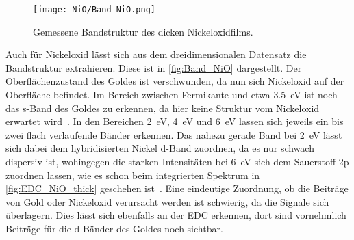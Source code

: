         \begin{figure}
            \centering
            \texttt{[image: NiO/Band\_NiO.png]}
            \caption{Gemessene Bandstruktur des dicken Nickeloxidfilms.}
            \label{fig:Band_NiO}
        \end{figure}
        Auch für Nickeloxid lässt sich aus dem dreidimensionalen Datensatz die Bandstruktur extrahieren.
        Diese ist in \autoref{fig:Band_NiO} dargestellt. %
        Der Oberflächenzustand des Goldes ist verschwunden, da nun sich Nickeloxid auf der Oberfläche befindet.
        Im Bereich zwischen Fermikante und etwa \SI{3.5}{\electronvolt} ist noch das s-Band des Goldes zu erkennen, da hier keine Struktur vom Nickeloxid erwartet wird~\cite{NiO_12}.
        In den Bereichen \SI{2}{\electronvolt}, \SI{4}{\electronvolt} und \SI{6}{\electronvolt} lassen sich jeweils ein bis zwei flach verlaufende Bänder erkennen.
        Das nahezu gerade Band bei \SI{2}{\electronvolt} lässt sich dabei dem hybridisierten Nickel d-Band zuordnen, da es nur schwach dispersiv ist, wohingegen die starken Intensitäten bei \SI{6}{\electronvolt} sich dem Sauerstoff 2p zuordnen lassen, wie es schon beim integrierten Spektrum in \autoref{fig:EDC_NiO_thick} geschehen ist~\cite{Hüfner}.
        Eine eindeutige Zuordnung, ob die Beiträge von Gold oder Nickeloxid verursacht werden ist schwierig, da die Signale sich überlagern. %
        Dies lässt sich ebenfalls an der EDC erkennen, dort sind vornehmlich Beiträge für die d-Bänder des Goldes noch sichtbar.
        
    \FloatBarrier
